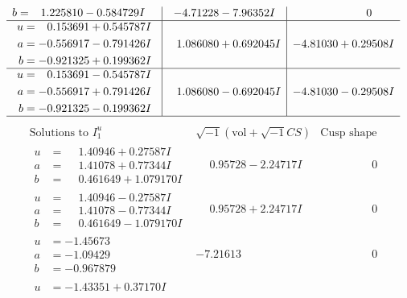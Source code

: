 \documentclass[1p]{elsarticle_modified}
\theoremstyle{definition}
\newcommand{\I}{\sqrt{-1}}
\begin{document}
$$\begin{array}{c|c|c}
\begin{aligned}
b &= \phantom{-}1.225810 - 0.584729 I\end{aligned}
 & -4.71228 - 7.96352 I & \phantom{-0.000000 } 0 \\ \hline\begin{aligned}
u &= \phantom{-}0.153691 + 0.545787 I \\
a &= -0.556917 - 0.791426 I \\
b &= -0.921325 + 0.199362 I\end{aligned}
 & \phantom{-}1.086080 + 0.692045 I & -4.81030 + 0.29508 I \\ \hline\begin{aligned}
u &= \phantom{-}0.153691 - 0.545787 I \\
a &= -0.556917 + 0.791426 I \\
b &= -0.921325 - 0.199362 I\end{aligned}
 & \phantom{-}1.086080 - 0.692045 I & -4.81030 - 0.29508 I\\
 \hline 
 \end{array}$$\newpage$$\begin{array}{c|c|c}  
\text{Solutions to }I^u_{1}& \I (\text{vol} + \sqrt{-1}CS) & \text{Cusp shape}\\
 \hline 
\begin{aligned}
u &= \phantom{-}1.40946 + 0.27587 I \\
a &= \phantom{-}1.41078 + 0.77344 I \\
b &= \phantom{-}0.461649 + 1.079170 I\end{aligned}
 & \phantom{-}0.95728 - 2.24717 I & \phantom{-0.000000 } 0 \\ \hline\begin{aligned}
u &= \phantom{-}1.40946 - 0.27587 I \\
a &= \phantom{-}1.41078 - 0.77344 I \\
b &= \phantom{-}0.461649 - 1.079170 I\end{aligned}
 & \phantom{-}0.95728 + 2.24717 I & \phantom{-0.000000 } 0 \\ \hline\begin{aligned}
u &= -1.45673\phantom{ +0.000000I} \\
a &= -1.09429\phantom{ +0.000000I} \\
b &= -0.967879\phantom{ +0.000000I}\end{aligned}
 & -7.21613\phantom{ +0.000000I} & \phantom{-0.000000 } 0 \\ \hline\begin{aligned}
u &= -1.43351 + 0.37170 I \\

\end{aligned}
\end{array}$$
\end{document}
